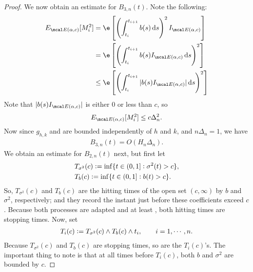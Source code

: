 \begin{appendices}
\begin{proof}
We now obtain an estimate for  $B_{3,n}(t)$. Note the following:
\begin{align}
  \eind[ M_i^2] & = \e\left[\left(\int_{t_i}^{t_{i+1}} b(s) \D s\right)^2\indvol\right] \notag\\
  & = \e\left[\left(\int_{t_i}^{t_{i+1}} b(s)\indvol \D s\right)^2\right] \notag\\
& \le \e\left[\left(\int_{t_i}^{t_{i+1}}\vert b(s)\indvol\vert \D s\right)^2\right] \notag
  \label{}
\end{align}
Note that $\vert b(s)\indvol\vert$ is either 0 or less than $c$, so   
\begin{align}
 \eind[ M_i^2] \le c \Delta_n^2. 
  \label{eq:msq}
\end{align}
 Now since  $g_{h,k}$ and \tghk  are bounded independently of $h$ and $k$, and $n\Delta_n = 1$, we have
\begin{align}
  B_{3,n}(t) = O( H_n \Delta_n).
  \label{}
\end{align}
We obtain an estimate for $B_{2,n}(t)$ next, but first let 
\begin{align}
&T_{\sigma^2}(c)   := \inf\{t \in  (0,1]: \sigma^2(t) > c\}, \\ 
  &T_{b}(c)  := \inf\{t \in (0,1]: b(t) > c\}. \notag
  \label{}
\end{align}
So, $T_{\sigma^2}(c)$ and $T_{b}(c)$ are the hitting times of the open set $(c, \infty)$ by $b$ and $\sigma^2$, respectively; and they record the instant just before these coefficients exceed $c$. Because both processes are adapted and at least \cadlag, both hitting times  are stopping times. Now, set 
\begin{align}
T_i(c)  :=  T_{\sigma^2}(c) \wedge  T_{b}(c) \wedge  t_i, \qquad i= 1, \cdots, n. \notag
\end{align}
Because  $T_{\sigma^2}(c)$ and   $T_{b}(c)$ are stopping times, so are the  $T_i(c)$'s. The important thing to note is that at all times before  $T_i(c)$, both $b$ and $\sigma^2$ are bounded by $c$.  


\end{proof}
\end{appendices}
